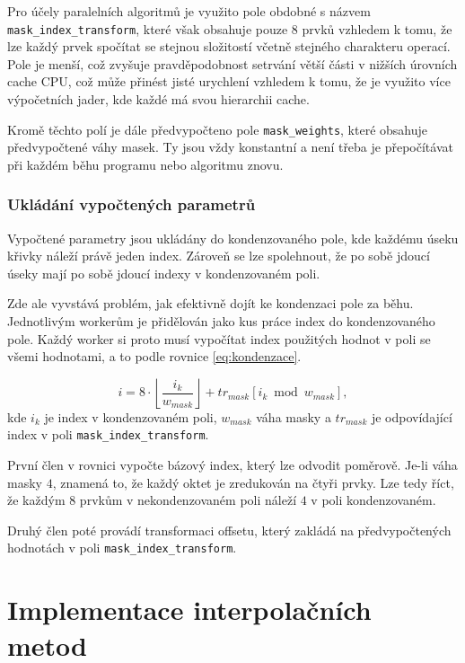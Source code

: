 \documentclass[]{thesiskiv}
\begin{document}
Pro účely paralelních algoritmů je využito pole obdobné s názvem\\ \texttt{mask\_index\_transform}, které však obsahuje pouze $8$ prvků vzhledem k tomu, že lze každý prvek spočítat se stejnou složitostí včetně stejného charakteru operací. Pole je menší, což zvyšuje pravděpodobnost setrvání větší části v nižších úrovních cache CPU, což může přinést jisté urychlení vzhledem k tomu, že je využito více výpočetních jader, kde každé má svou hierarchii cache.

Kromě těchto polí je dále předvypočteno pole \texttt{mask\_weights}, které obsahuje předvypočtené váhy masek. Ty jsou vždy konstantní a není třeba je přepočítávat při každém běhu programu nebo algoritmu znovu.

\subsubsection*{Ukládání vypočtených parametrů}

Vypočtené parametry jsou ukládány do kondenzovaného pole, kde každému úseku křivky náleží právě jeden index. Zároveň se lze spolehnout, že po sobě jdoucí úseky mají po sobě jdoucí indexy v kondenzovaném poli.

Zde ale vyvstává problém, jak efektivně dojít ke kondenzaci pole za běhu. Jednotlivým workerům je přidělován jako kus práce index do kondenzovaného pole. Každý worker si proto musí vypočítat index použitých hodnot v poli se všemi hodnotami, a to podle rovnice \ref{eq:kondenzace}.

\begin{equation}\label{eq:kondenzace}
i = 8 \cdot\left\lfloor\frac{i_{k}}{w_{mask}}\right\rfloor + tr_{mask}[i_{k} \bmod w_{mask}],
\end{equation}
kde $i_{k}$ je index v kondenzovaném poli, $w_{mask}$ váha masky a $tr_{mask}$ je odpovídající index v poli \texttt{mask\_index\_transform}.

První člen v rovnici vypočte bázový index, který lze odvodit poměrově. Je-li váha masky $4$, znamená to, že každý oktet je zredukován na čtyři prvky. Lze tedy říct, že každým $8$ prvkům v nekondenzovaném poli náleží $4$ v poli kondenzovaném.

Druhý člen poté provádí transformaci offsetu, který zakládá na předvypočtených hodnotách v poli \texttt{mask\_index\_transform}.

\section{Implementace interpolačních metod}
\end{document}
